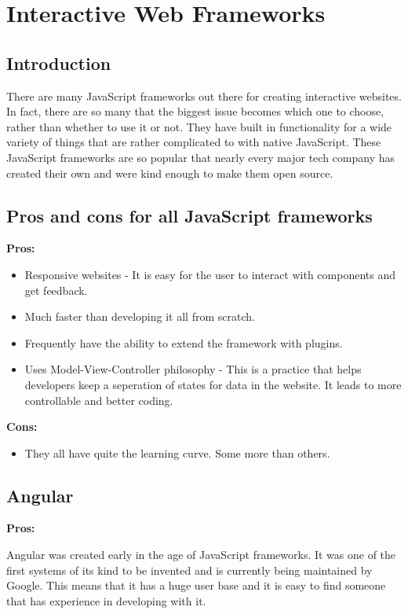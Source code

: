 \documentclass[draftclsnofoot,onecolumn,letterpaper,10pt,compsoc]{IEEEtran}
\begin{document}
\section{Interactive Web Frameworks}
  \subsection{Introduction}

  There are many JavaScript frameworks out there for creating interactive websites.
  In fact, there are so many that the biggest issue becomes which one to choose, rather than whether to use it or not.
  They have built in functionality for a wide variety of things that are rather complicated to with native JavaScript.
  These JavaScript frameworks are so popular that nearly every major tech company has created their own and were kind enough to make them open source.


  \subsection{Pros and cons for all JavaScript frameworks}
    \textbf{Pros:}
    \begin{itemize}
      \item Responsive websites - It is easy for the user to interact with components and get feedback.
      \item Much faster than developing it all from scratch.
      \item Frequently have the ability to extend the framework with plugins.
      \item Uses Model-View-Controller philosophy - This is a practice that helps developers keep a seperation of states for data in the website. It leads to more controllable and better coding.
    \end{itemize}

    \textbf{Cons:}
    \begin{itemize}
      \item They all have quite the learning curve. Some more than others.
    \end{itemize}

	\subsection{Angular}

  \textbf{Pros:}

  Angular was created early in the age of JavaScript frameworks.
  It was one of the first systems of its kind to be invented and is currently being maintained by Google.
  This means that it has a huge user base and it is easy to find someone that has experience in developing with it.
\end{document}

